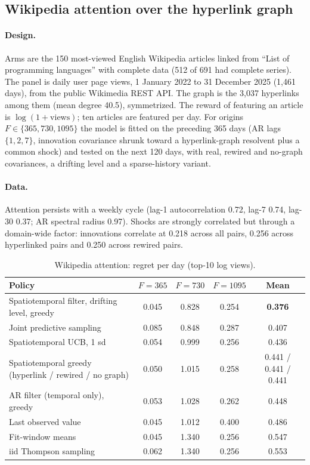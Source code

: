 \documentclass[11pt]{article}
\theoremstyle{definition}
\theoremstyle{remark}
\begin{document}
\subsection{Wikipedia attention over the hyperlink graph}\label{sec:wiki}

\paragraph{Design.} Arms are the 150 most-viewed English Wikipedia articles linked from ``List of programming languages'' with complete data (512 of 691 had complete series). The panel is daily user page views, 1 January 2022 to 31 December 2025 (1,461 days), from the public Wikimedia REST API. The graph is the 3,037 hyperlinks among them (mean degree 40.5), symmetrized. The reward of featuring an article is $\log(1+\text{views})$; ten articles are featured per day. For origins $F\in\{365,730,1095\}$ the model is fitted on the preceding 365 days (AR lags $\{1,2,7\}$, innovation covariance shrunk toward a hyperlink-graph resolvent plus a common shock) and tested on the next 120 days, with real, rewired and no-graph covariances, a drifting level and a sparse-history variant.

\paragraph{Data.} Attention persists with a weekly cycle (lag-1 autocorrelation 0.72, lag-7 0.74, lag-30 0.37; AR spectral radius 0.97). Shocks are strongly correlated but through a domain-wide factor: innovations correlate at 0.218 across all pairs, 0.256 across hyperlinked pairs and 0.250 across rewired pairs.

\begin{table}[t]\centering\small
\begin{tabular}{lcccc}
\toprule
Policy & $F=365$ & $F=730$ & $F=1095$ & Mean \\
\midrule
Spatiotemporal filter, drifting level, greedy & 0.045 & 0.828 & 0.254 & \textbf{0.376} \\
Joint predictive sampling & 0.085 & 0.848 & 0.287 & 0.407 \\
Spatiotemporal UCB, 1 sd & 0.054 & 0.999 & 0.256 & 0.436 \\
Spatiotemporal greedy (hyperlink / rewired / no graph) & 0.050 & 1.015 & 0.258 & 0.441 / 0.441 / 0.441 \\
AR filter (temporal only), greedy & 0.053 & 1.028 & 0.262 & 0.448 \\
Last observed value & 0.045 & 1.012 & 0.400 & 0.486 \\
Fit-window means & 0.045 & 1.340 & 0.256 & 0.547 \\
iid Thompson sampling & 0.062 & 1.340 & 0.256 & 0.553 \\
\bottomrule
\end{tabular}
\caption{Wikipedia attention: regret per day (top-10 log views).}\label{tab:wiki}
\end{table}
\end{document}
